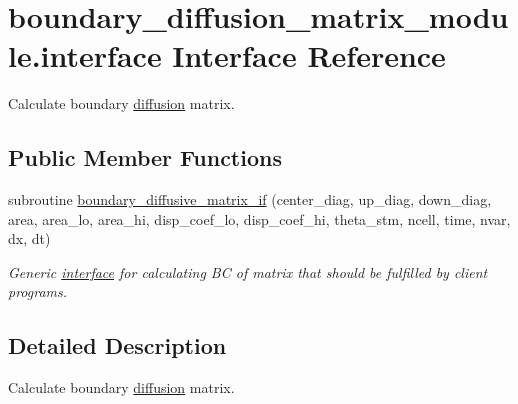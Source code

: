 \hypertarget{a00003}{
\section{boundary\_\-diffusion\_\-matrix\_\-module.interface Interface Reference}
\label{a00003}
}
Calculate boundary \hyperlink{a00056}{diffusion} matrix.  


\subsection*{Public Member Functions}
\begin{CompactItemize}
\item 
subroutine \hyperlink{a00003_264875de0ad3240178f5d579d8542776}{boundary\_\-diffusive\_\-matrix\_\-if} (center\_\-diag, up\_\-diag, down\_\-diag, area, area\_\-lo, area\_\-hi, disp\_\-coef\_\-lo, disp\_\-coef\_\-hi, theta\_\-stm, ncell, time, nvar, dx, dt)
\begin{CompactList}\small\item\em Generic \hyperlink{a00003}{interface} for calculating BC of matrix that should be fulfilled by client programs. \item\end{CompactList}\end{CompactItemize}


\subsection{Detailed Description}
Calculate boundary \hyperlink{a00056}{diffusion} matrix. 

